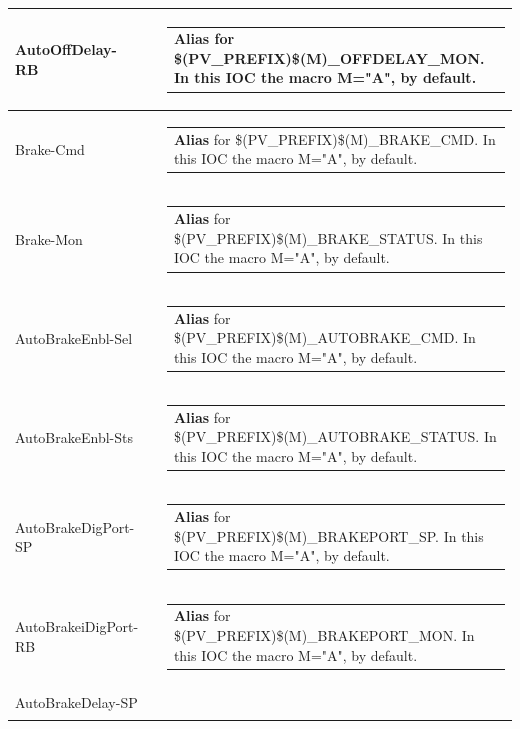 \documentclass[openany]{article}
\begin{document}
\begin{longtable}{| m{4.5cm} m{2.5cm}  m{8.0cm} |}
        AutoOffDelay-RB &  & \begin{tabular}{@{}m{6cm}@{}}
                \textbf{Alias} for \$(PV\_PREFIX)\$(M)\_OFFDELAY\_MON. In this IOC the macro M="A", by default.
            \end{tabular} \hypertarget{}{}\\ \hline
        Brake-Cmd &  & \begin{tabular}{@{}m{6cm}@{}}
                \textbf{Alias} for \$(PV\_PREFIX)\$(M)\_BRAKE\_CMD. In this IOC the macro M="A", by default.
            \end{tabular} \hypertarget{}{}\\ \hline
        Brake-Mon &  & \begin{tabular}{@{}m{6cm}@{}}
                \textbf{Alias} for \$(PV\_PREFIX)\$(M)\_BRAKE\_STATUS. In this IOC the macro M="A", by default.
            \end{tabular} \hypertarget{}{}\\ \hline
        AutoBrakeEnbl-Sel &  & \begin{tabular}{@{}m{6cm}@{}}
                \textbf{Alias} for \$(PV\_PREFIX)\$(M)\_AUTOBRAKE\_CMD. In this IOC the macro M="A", by default.
            \end{tabular} \hypertarget{}{}\\ \hline
        AutoBrakeEnbl-Sts &  & \begin{tabular}{@{}m{6cm}@{}}
                \textbf{Alias} for \$(PV\_PREFIX)\$(M)\_AUTOBRAKE\_STATUS. In this IOC the macro M="A", by default.
            \end{tabular} \hypertarget{}{}\\ \hline
        AutoBrakeDigPort-SP &  & \begin{tabular}{@{}m{6cm}@{}}
                \textbf{Alias} for \$(PV\_PREFIX)\$(M)\_BRAKEPORT\_SP. In this IOC the macro M="A", by default.
            \end{tabular} \hypertarget{}{}\\ \hline
        AutoBrakeiDigPort-RB &  & \begin{tabular}{@{}m{6cm}@{}}
                \textbf{Alias} for \$(PV\_PREFIX)\$(M)\_BRAKEPORT\_MON. In this IOC the macro M="A", by default.
            \end{tabular} \hypertarget{}{}\\ \hline
        AutoBrakeDelay-SP &  & \begin{tabular}{@{}m{6cm}@{}}

\end{tabular}
\end{longtable}
\end{document}
